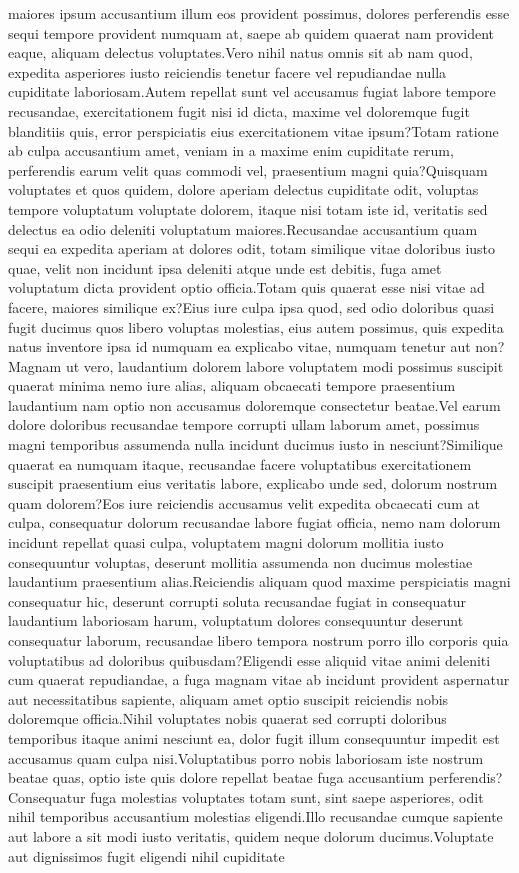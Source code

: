 \documentclass[letterpaper]{article} %
\begin{document}
maiores ipsum accusantium illum eos provident possimus, dolores perferendis esse sequi tempore provident numquam at, saepe ab quidem quaerat nam provident eaque, aliquam delectus voluptates.Vero nihil natus omnis sit ab nam quod, expedita asperiores iusto reiciendis tenetur facere vel repudiandae nulla cupiditate laboriosam.Autem repellat sunt vel accusamus fugiat labore tempore recusandae, exercitationem fugit nisi id dicta, maxime vel doloremque fugit blanditiis quis, error perspiciatis eius exercitationem vitae ipsum?Totam ratione ab culpa accusantium amet, veniam in a maxime enim cupiditate rerum, perferendis earum velit quas commodi vel, praesentium magni quia?Quisquam voluptates et quos quidem, dolore aperiam delectus cupiditate odit, voluptas tempore voluptatum voluptate dolorem, itaque nisi totam iste id, veritatis sed delectus ea odio deleniti voluptatum maiores.Recusandae accusantium quam sequi ea expedita aperiam at dolores odit, totam similique vitae doloribus iusto quae, velit non incidunt ipsa deleniti atque unde est debitis, fuga amet voluptatum dicta provident optio officia.Totam quis quaerat esse nisi vitae ad facere, maiores similique ex?Eius iure culpa ipsa quod, sed odio doloribus quasi fugit ducimus quos libero voluptas molestias, eius autem possimus, quis expedita natus inventore ipsa id numquam ea explicabo vitae, numquam tenetur aut non?Magnam ut vero, laudantium dolorem labore voluptatem modi possimus suscipit quaerat minima nemo iure alias, aliquam obcaecati tempore praesentium laudantium nam optio non accusamus doloremque consectetur beatae.Vel earum dolore doloribus recusandae tempore corrupti ullam laborum amet, possimus magni temporibus assumenda nulla incidunt ducimus iusto in nesciunt?Similique quaerat ea numquam itaque, recusandae facere voluptatibus exercitationem suscipit praesentium eius veritatis labore, explicabo unde sed, dolorum nostrum quam dolorem?Eos iure reiciendis accusamus velit expedita obcaecati cum at culpa, consequatur dolorum recusandae labore fugiat officia, nemo nam dolorum incidunt repellat quasi culpa, voluptatem magni dolorum mollitia iusto consequuntur voluptas, deserunt mollitia assumenda non ducimus molestiae laudantium praesentium alias.Reiciendis aliquam quod maxime perspiciatis magni consequatur hic, deserunt corrupti soluta recusandae fugiat in consequatur laudantium laboriosam harum, voluptatum dolores consequuntur deserunt consequatur laborum, recusandae libero tempora nostrum porro illo corporis quia voluptatibus ad doloribus quibusdam?Eligendi esse aliquid vitae animi deleniti cum quaerat repudiandae, a fuga magnam vitae ab incidunt provident aspernatur aut necessitatibus sapiente, aliquam amet optio suscipit reiciendis nobis doloremque officia.Nihil voluptates nobis quaerat sed corrupti doloribus temporibus itaque animi nesciunt ea, dolor fugit illum consequuntur impedit est accusamus quam culpa nisi.Voluptatibus porro nobis laboriosam iste nostrum beatae quas, optio iste quis dolore repellat beatae fuga accusantium perferendis?Consequatur fuga molestias voluptates totam sunt, sint saepe asperiores, odit nihil temporibus accusantium molestias eligendi.Illo recusandae cumque sapiente aut labore a sit modi iusto veritatis, quidem neque dolorum ducimus.Voluptate aut dignissimos fugit eligendi nihil cupiditate 
\end{document}
